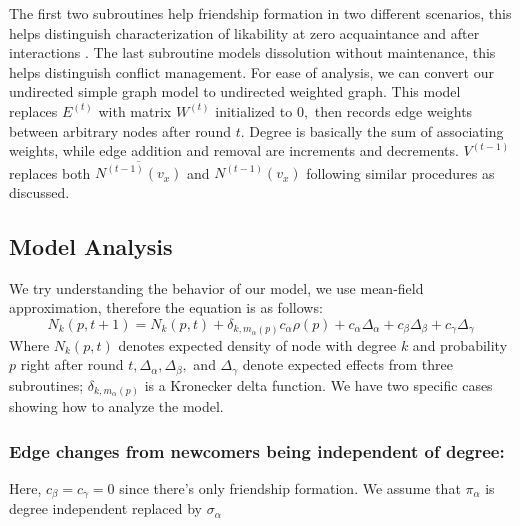 \documentclass[runningheads]{llncs}
\begin{document}
The first two subroutines help friendship formation in two different scenarios, this helps distinguish characterization of likability at zero acquaintance and after interactions \cite{ref_25}. The last subroutine models dissolution without maintenance, this helps distinguish conflict management. For ease of analysis, we can convert our undirected simple graph model to undirected weighted graph. This model replaces $E^{(t)}$ with matrix $W^{(t)}$ initialized to $0,$ then records edge weights between arbitrary nodes after round $t .$ Degree is basically the sum of associating weights, while edge addition and removal are increments and decrements. $V^{(t-1)}$ replaces both $\overline{N^{(t-1)}\left(v_{x}\right)}$ and $N^{(t-1)}\left(v_{x}\right)$ following similar procedures as discussed.

\subsection{Model Analysis}
We try understanding the behavior of our model, we use mean-field approximation, therefore the equation is as follows:
\begin{equation}\label{eq_1}
N_{k}(p, t+1) = N_{k}(p, t)+\delta_{k, m_{\alpha}(p)} c_{\alpha} \rho(p)+c_{\alpha} \Delta_{\alpha}+c_{\beta} \Delta_{\beta}+c_{\gamma} \Delta_{\gamma}
\end{equation}
Where $N_{k}(p, t)$ denotes expected density of node with degree $k$ and probability $p$ right after round $t, \Delta_{\alpha}, \Delta_{\beta},$ and $\Delta_{\gamma}$ denote expected effects from three subroutines; $\delta_{k, m_{\alpha}(p)}$ is a Kronecker delta function. We have two specific cases showing how to analyze the model.

\subsubsection{Edge changes from newcomers being independent of degree:}
Here, $c_{\beta}=c_{\gamma}=0$ since there's only friendship formation. We assume that $\pi_{\alpha}$ is degree independent replaced by $\sigma_{\alpha}$
\end{document}
